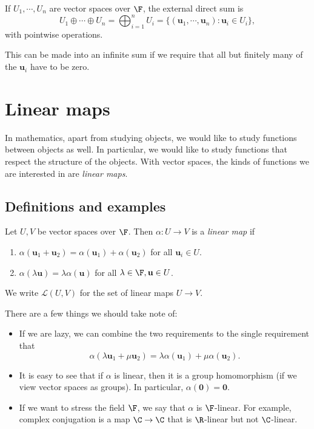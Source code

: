 \documentclass[a4paper]{article}
\begin{document}
\begin{defi}
  If $U_1, \cdots, U_n$ are vector spaces over $\F$, the external direct sum is
  \[
    U_1 \oplus \cdots \oplus U_n = \bigoplus_{i = 1}^n U_i = \{(\mathbf{u}_1, \cdots, \mathbf{u}_n): \mathbf{u}_i \in U_i\},
  \]
  with pointwise operations.

  This can be made into an infinite sum if we require that all but finitely many of the $\mathbf{u}_i$ have to be zero.
\end{defi}

\section{Linear maps}
In mathematics, apart from studying objects, we would like to study functions between objects as well. In particular, we would like to study functions that respect the structure of the objects. With vector spaces, the kinds of functions we are interested in are \emph{linear maps}.
\subsection{Definitions and examples}
\begin{defi}
  Let $U, V$ be vector spaces over $\F$. Then $\alpha: U\to V$ is a \emph{linear map} if
  \begin{enumerate}
    \item $\alpha(\mathbf{u}_1 + \mathbf{u}_2) = \alpha(\mathbf{u}_1) + \alpha(\mathbf{u}_2)$ for all $\mathbf{u}_i \in U$.
    \item $\alpha(\lambda \mathbf{u}) = \lambda \alpha (\mathbf{u})$ for all $\lambda \in \F, \mathbf{u}\in U$.
  \end{enumerate}
  We write $\mathcal{L}(U, V)$ for the set of linear maps $U\to V$.
\end{defi}
There are a few things we should take note of:
\begin{itemize}
  \item If we are lazy, we can combine the two requirements to the single requirement that
    \[
      \alpha (\lambda \mathbf{u}_1 + \mu \mathbf{u}_2) = \lambda \alpha(\mathbf{u}_1) + \mu \alpha(\mathbf{u}_2).
    \]
  \item It is easy to see that if $\alpha$ is linear, then it is a group homomorphism (if we view vector spaces as groups). In particular, $\alpha (\mathbf{0}) = \mathbf{0}$.
  \item If we want to stress the field $\F$, we say that $\alpha$ is $\F$-linear. For example, complex conjugation is a map $\C \to \C$ that is $\R$-linear but not $\C$-linear.
\end{itemize}
\end{document}
